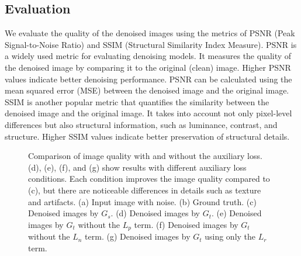 \documentclass[lettersize,journal]{IEEEtran}
\begin{document}
\subsection{Evaluation}
We evaluate the quality of the denoised images using the metrics of PSNR (Peak Signal-to-Noise Ratio) and SSIM (Structural Similarity Index Measure). PSNR is a widely used metric for evaluating denoising models. It measures the quality of the denoised image by comparing it to the original (clean) image. Higher PSNR values indicate better denoising performance. PSNR can be calculated using the mean squared error (MSE) between the denoised image and the original image. SSIM is another popular metric that quantifies the similarity between the denoised image and the original image. It takes into account not only pixel-level differences but also structural information, such as luminance, contrast, and structure. Higher SSIM values indicate better preservation of structural details.
\begin{figure*}[!t]
\centering
{}
\hfil
{}
\hfil
{}
\hfil
{}
\hfil
{}
\hfil
{}
\hfil
{}
\caption{Comparison of image quality with and without the auxiliary loss. (d), (e), (f), and (g) show results with different auxiliary loss conditions. Each condition improves the image quality compared to (c), but there are noticeable differences in details such as texture and artifacts. (a) Input image with noise. (b) Ground truth. (c) Denoised images by $G_s$. (d) Denoised images by $G_t$. (e) Denoised images by $G_t$ without the $L_p$ term. (f) Denoised images by $G_t$ without the $L_n$ term. (g) Denoised images by $G_t$ using only the $L_r$ term.}
\label{fig_sim}
\end{figure*}
\end{document}
